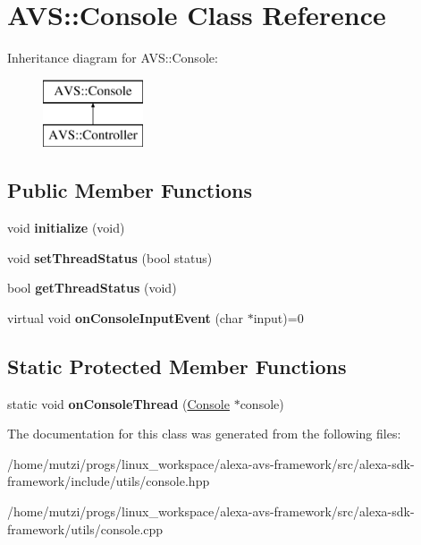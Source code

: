 \hypertarget{classAVS_1_1Console}{}\section{A\+VS\+:\+:Console Class Reference}
\label{classAVS_1_1Console}
Inheritance diagram for A\+VS\+:\+:Console\+:\begin{figure}[H]
\begin{center}
\leavevmode
\includegraphics[height=2.000000cm]{d1/d04/classAVS_1_1Console}
\end{center}
\end{figure}
\subsection*{Public Member Functions}
\begin{DoxyCompactItemize}
\item 
\mbox{\label{classAVS_1_1Console_a0063647ca40aad188392f6dc0e60b611}} 
void {\bfseries initialize} (void)
\item 
\mbox{\label{classAVS_1_1Console_abc6a8090ebd85a91060cb601f266f5f5}} 
void {\bfseries set\+Thread\+Status} (bool status)
\item 
\mbox{\label{classAVS_1_1Console_a04cd35f44d8066071c4bad9e8bc64cf1}} 
bool {\bfseries get\+Thread\+Status} (void)
\item 
\mbox{\label{classAVS_1_1Console_ae9f4516de62eac6f638f0c38b14c1d93}} 
virtual void {\bfseries on\+Console\+Input\+Event} (char $\ast$input)=0
\end{DoxyCompactItemize}
\subsection*{Static Protected Member Functions}
\begin{DoxyCompactItemize}
\item 
\mbox{\label{classAVS_1_1Console_a158c97820262c33f1d16e43be6115563}} 
static void {\bfseries on\+Console\+Thread} (\hyperlink{classAVS_1_1Console}{Console} $\ast$console)
\end{DoxyCompactItemize}


The documentation for this class was generated from the following files\+:\begin{DoxyCompactItemize}
\item 
/home/mutzi/progs/linux\+\_\+workspace/alexa-\/avs-\/framework/src/alexa-\/sdk-\/framework/include/utils/console.\+hpp\item 
/home/mutzi/progs/linux\+\_\+workspace/alexa-\/avs-\/framework/src/alexa-\/sdk-\/framework/utils/console.\+cpp\end{DoxyCompactItemize}
